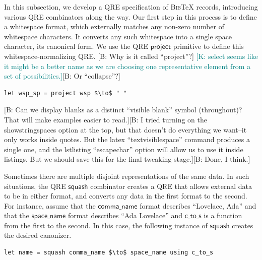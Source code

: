 \documentclass[acmsmall,review,anonymous]{acmart}
\newcommand{\FINISH}[3]{\ifdraft\textcolor{#1}{[#2: #3]}\fi}
\newcommand{\bcp}[1]{\FINISH{dkred}{B}{#1}}
\newcommand{\ksf}[1]{\FINISH{teal}{K}{#1}}
\newcommand{\codefont}[1]{\ensuremath{\mathsf{#1}}}
\newcommand{\kw}[1]{\codefont{#1}}
\newcommand{\bibtex}{\textsc{Bib}\TeX{}}
\begin{document}
In this subsection, we develop a QRE specification of \bibtex{}
records, introducing various QRE combinators along the way. 
Our first step in this process is to define a
whitespace format, which externally matches any non-zero number of whitespace
characters. It converts any such whitespace into a single space
character, its canonical form. 
We use the QRE \kw{project} primitive to define this
whitespace-normalizing QRE. \bcp{Why is it called
``project''?} \ksf{select seems like it might be a better name as we
are choosing one representative element from a set of possibilities.}\bcp{Or
``collapse''?}

\begin{lstlisting}
let wsp_sp = project wsp $\to$ " "
\end{lstlisting}
\iflastminute
\bcp{Can we display blanks as a distinct ``visible blank'' symbol
(throughout)?  That will make examples easier to read.}\bcp{I tried turning
on the showstringspaces option at the top, but that doesn't do everything we
want--it only works inside quotes.  But the latex ``textvisiblespace'' command
produces a single one, and the lstlisting ``escapechar'' option will allow
us to use it inside listings.  But we should save this for the final
tweaking stage.}\bcp{Done, I think.}
\fi

Sometimes there are multiple disjoint representations of the same data.
In such situations, the QRE \kw{squash} combinator creates a QRE that
allows external data to be in either format, and converts any
data in the first format to the second.
For instance, assume that
the \codefont{comma\_name} format describes ``Lovelace, Ada''
and that the \codefont{space\_name} format describes ``Ada Lovelace''
and \codefont{c\_to\_s} is a function from the first to the second.  In this
case, the following instance of \kw{squash} creates the desired canonizer.


\begin{lstlisting}
let name = squash comma_name $\to$ space_name using c_to_s
\end{lstlisting}
\end{document}
